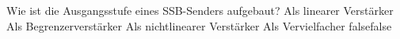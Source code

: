    {Wie ist die Ausgangsstufe eines SSB-Senders aufgebaut?  }
    {Als linearer Verstärker}
    {Als Begrenzerverstärker}
    {Als nichtlinearer Verstärker}
    {Als Vervielfacher}
    {false}{false}